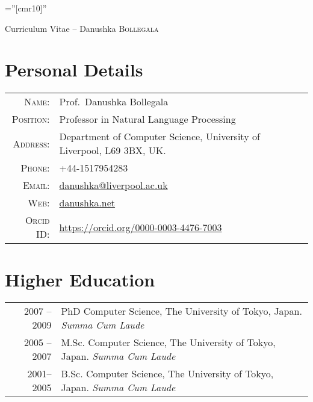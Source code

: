 \documentclass[a4paper,11pt]{article}
\begin{document}

\font\fb=''[cmr10]'' %

\par{\centering
		{\Large Curriculum Vitae -- Danushka \textsc{Bollegala}
	}\bigskip\par}

\section{Personal Details}

\begin{tabular}{rl}
    \textsc{Name:} & Prof.~Danushka Bollegala\\
    \textsc{Position:} & Professor in Natural Language Processing\\
    \textsc{Address:}   & Department of Computer Science, University of Liverpool, L69 3BX, UK. \\
    \textsc{Phone:}     & +44-1517954283\\
    \textsc{Email:}     & \href{mailto:danushka@liverpool.ac.uk}{danushka@liverpool.ac.uk} \\
    \textsc{Web:} & \href{http://danushka.net}{danushka.net} \\
    \textsc{Orcid ID:} & \url{https://orcid.org/0000-0003-4476-7003}\\
\end{tabular}


\section{Higher Education}
\begin{tabular}{r|p{10cm}}
\textsc{2007 -- 2009} & PhD Computer Science, The University of Tokyo, Japan.  \emph{Summa Cum Laude} \\
\textsc{2005 -- 2007} & M.Sc. Computer Science, The University of Tokyo, Japan. \emph{Summa Cum Laude} \\
\textsc{2001-- 2005} & B.Sc. Computer Science, The University of Tokyo, Japan. \emph{Summa Cum Laude} \\
\end{tabular}
\end{document}
